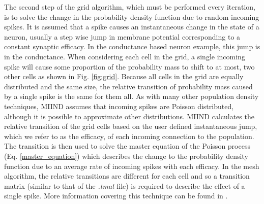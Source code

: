 \documentclass[utf8]{frontiersSCNS} %
\begin{document}
The second step of the grid algorithm, which must be performed every iteration, is to solve the change in the probability density function due to random incoming spikes. It is assumed that a spike causes an instantaneous change in the state of a neuron, usually a step wise jump in membrane potential corresponding to a constant synaptic efficacy. In the conductance based neuron example, this jump is in the conductance. When considering each cell in the grid, a single incoming spike will cause some proportion of the probability mass to shift to at most, two other cells as shown in Fig. \ref{fig:grid}. Because all cells in the grid are equally distributed and the same size, the relative transition of probability mass caused by a single spike is the same for them all. As with many other population density techniques, MIIND assumes that incoming spikes are Poisson distributed, although it is possible to approximate other distributions. MIIND calculates the relative transition of the grid cells based on the user defined instantaneous jump, which we refer to as the efficacy, of each incoming connection to the population. The transition is then used to solve the master equation of the Poisson process (Eq. \ref{master_equation}) which describes the change to the probability density function due to an average rate of incoming spikes with each efficacy. In the mesh algorithm, the relative transitions are different for each cell and so a transition matrix (similar to that of the \textit{.tmat} file) is required to describe the effect of a single spike. More information covering this technique can be found in \cite{de2019computational,de2013generic}.\\
\end{document}
